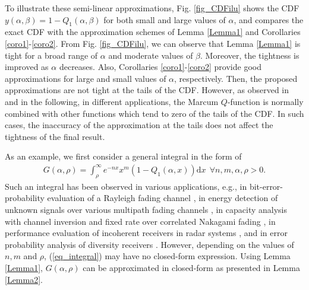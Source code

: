 To illustrate these semi-linear approximations, Fig. \ref{fig_CDFilu} shows the CDF $y(\alpha,\beta)= 1-Q_1(\alpha,\beta)$ for both small and large values of $\alpha$, and compares the exact CDF with the approximation schemes of Lemma \ref{Lemma1} and Corollaries \ref{coro1}-\ref{coro2}. From Fig. \ref{fig_CDFilu}, we can observe that Lemma \ref{Lemma1} is tight for a broad range of $\alpha$  and moderate values of $\beta$. Moreover, the tightness is improved as $\alpha$ decreases. Also,  Corollaries \ref{coro1}-\ref{coro2} provide good approximations for large and small values of $\alpha$, respectively. Then, the proposed approximations are not tight at the tails of the CDF. However, as observed in \cite{Bocus2013CLapproximation,Fu2011GLOBECOMexponential,Makki2013TCfeedback,Makki2011Eurasipcapacity,Makki2018WCLwireless,Makki2016TVTperformance,Simon2003TWCsome,Suraweera2010TVTcapacity,Ma2000JSACunified,Digham2007TCenergy,Cao2016CLsolutions,sofotasios2015solutions,Azari2018TCultra,Alam2014INFOCOMWrobust,Gao2018IAadmm,Shen2018TVToutage,Song2017JLTimpact,Tang2019IAan}  and in the following, in different applications,  the Marcum $Q$-function is normally combined with other functions which tend to zero of the tails of the CDF. In such cases, the inaccuracy of the approximation at the tails does not affect the tightness of the final result. 














As an example, we first consider a general integral in the form of
\begin{align}\label{eq_integral}
G(\alpha,\rho)=\int_\rho^\infty{e^{-nx} x^m \left(1-Q_1(\alpha,x)\right)\text{d}x} ~~\forall n,m,\alpha,\rho>0.
\end{align}
Such an integral has been observed in various applications, e.g., in bit-error-probability evaluation of a Rayleigh fading channel \cite[eq. (1) (13)]{Simon2003TWCsome}, in energy detection of unknown signals over various multipath fading channels \cite[eq. (2)]{Cao2016CLsolutions}, in capacity analysis with channel inversion and fixed rate over correlated Nakagami fading \cite[eq. (1)]{sofotasios2015solutions}, in performance evaluation of  incoherent receivers in radar systems \cite[eq. (3)]{Cui2012ELtwo}, and in error probability analysis of diversity receivers \cite[eq. (1)]{Gaur2003TVTsome}. However, depending on the values of $n, m$ and $\rho$, (\ref{eq_integral}) may have no closed-form expression. Using Lemma \ref{Lemma1}, $G(\alpha,\rho)$ can be approximated in closed-form as presented in Lemma \ref{Lemma2}.

